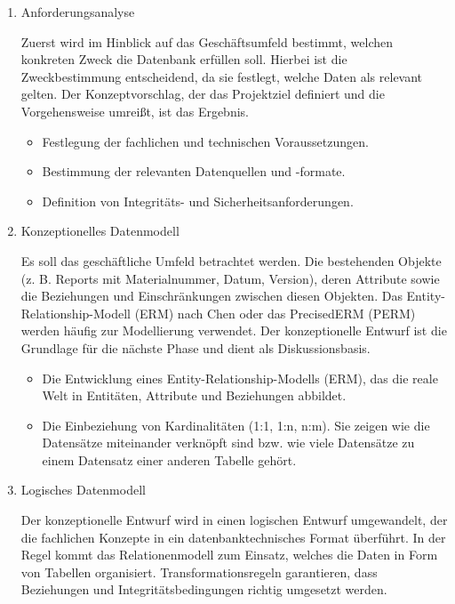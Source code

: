 \begin{enumerate}

\item
Anforderungsanalyse

Zuerst wird im Hinblick auf das Geschäftsumfeld bestimmt, welchen konkreten Zweck die Datenbank erfüllen soll.
Hierbei ist die Zweckbestimmung entscheidend, da sie festlegt, welche Daten als relevant gelten.
Der Konzeptvorschlag, der das Projektziel definiert und die Vorgehensweise umreißt, ist das Ergebnis.
\begin{itemize}

\item
Festlegung der fachlichen und technischen Voraussetzungen.
\item
Bestimmung der relevanten Datenquellen und -formate.
\item
Definition von Integritäts- und Sicherheitsanforderungen.

\end{itemize}

\item
Konzeptionelles Datenmodell

Es soll das geschäftliche Umfeld betrachtet werden.
Die bestehenden Objekte (z. B. Reports mit Materialnummer, Datum, Version), deren Attribute sowie die Beziehungen und Einschränkungen zwischen diesen Objekten.
Das Entity-Relationship-Modell (ERM) nach Chen oder das PrecisedERM (PERM) werden häufig zur Modellierung verwendet.
Der konzeptionelle Entwurf ist die Grundlage für die nächste Phase und dient als Diskussionsbasis.
\begin{itemize}

\item Die Entwicklung eines Entity-Relationship-Modells (ERM), das die reale Welt in Entitäten, Attribute und Beziehungen abbildet.
\item Die Einbeziehung von Kardinalitäten (1:1, 1:n, n:m). Sie zeigen wie die Datensätze miteinander verknöpft sind bzw. wie viele Datensätze zu einem Datensatz einer anderen Tabelle gehört.

\end{itemize}

\item
Logisches Datenmodell

Der konzeptionelle Entwurf wird in einen logischen Entwurf umgewandelt, der die fachlichen Konzepte in ein datenbanktechnisches Format überführt.
In der Regel kommt das Relationenmodell zum Einsatz, welches die Daten in Form von Tabellen organisiert.
Transformationsregeln garantieren, dass Beziehungen und Integritätsbedingungen richtig umgesetzt werden.
\begin{itemize}


\end{itemize}
\end{enumerate}
